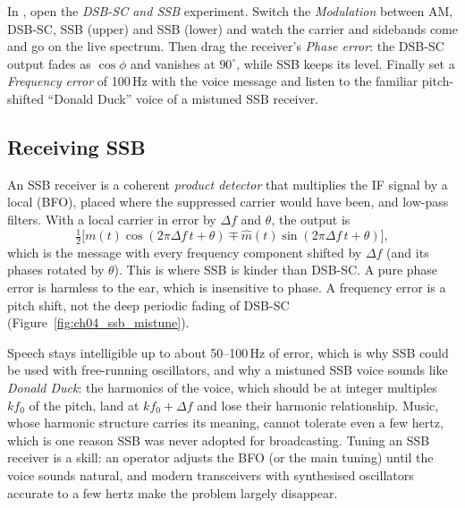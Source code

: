 \begin{tryit}
In , open the \emph{DSB-SC and SSB} experiment. Switch the \emph{Modulation}
between AM, DSB-SC, SSB (upper) and SSB (lower) and watch the carrier and sidebands come and go on the
live spectrum. Then drag the receiver's \emph{Phase error}: the DSB-SC output fades as $\cos\phi$ and
vanishes at $90^\circ$, while SSB keeps its level. Finally set a \emph{Frequency error} of 100\,Hz with the
voice message and listen to the familiar pitch-shifted ``Donald Duck'' voice of a mistuned SSB receiver.
\end{tryit}

\subsection{Receiving SSB}

An SSB receiver is a coherent \emph{product detector} that multiplies the IF signal by a local
 (BFO), placed where the suppressed carrier would have been, and low-pass
filters. With a local carrier in error by $\Delta f$ and $\theta$, the output is
\begin{equation}
\tfrac12\big[m(t)\cos(2\pi\Delta f\,t+\theta)\mp\hat m(t)\sin(2\pi\Delta f\,t+\theta)\big],
\end{equation}
which is the message with every frequency component shifted by $\Delta f$ (and its phases rotated by
$\theta$). This is where SSB is kinder than DSB-SC. A pure phase error is harmless to the ear, which is
insensitive to phase. A frequency error is a pitch shift, not the deep periodic fading of DSB-SC
(Figure~\ref{fig:ch04_ssb_mistune}).


Speech stays intelligible up to about 50--100\,Hz of error, which is why SSB could be used with
free-running oscillators, and why a mistuned SSB voice sounds like \emph{Donald Duck}: the harmonics of
the voice, which should be at integer multiples $kf_0$ of the pitch, land at $kf_0+\Delta f$ and lose
their harmonic relationship. Music, whose harmonic structure carries its meaning, cannot tolerate even a
few hertz, which is one reason SSB was never adopted for broadcasting. Tuning an SSB receiver is a skill:
an operator adjusts the BFO (or the main tuning) until the voice sounds natural, and modern transceivers
with synthesised oscillators accurate to a few hertz make the problem largely disappear.

